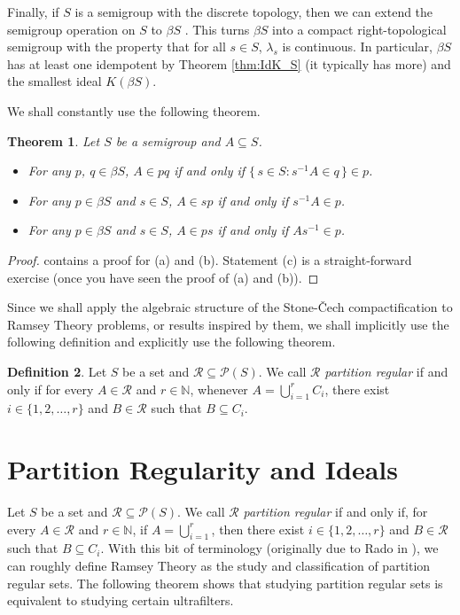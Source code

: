 \documentclass[12pt]{article}
\theoremstyle{plain}
\newtheorem{thm}{Theorem}[section]
\theoremstyle{definition}
\newtheorem{defn}[thm]{Definition}
\newcommand{\bbN}{\mathbb{N}}
\newcommand{\calP}{\mathcal{P}}
\newcommand{\calR}{\mathcal{R}}
\begin{document}
Finally, if $S$ is a semigroup with the discrete topology, then we can
extend the semigroup operation on $S$ to $\beta S$ \cite[Theorem
4.1]{Hindman:1998fk}.
This turns $\beta S$ into a compact right-topological semigroup with
the property that for all $s \in S$, $\lambda_s$ is continuous. 
In particular, $\beta S$ has at least one idempotent by Theorem
\ref{thm:IdK_S} (it typically has more) and the smallest ideal
$K(\beta S)$.

We shall constantly use the following theorem.
\begin{thm}
  Let $S$ be a semigroup and $A \subseteq S$.
  \begin{itemize}
    \item[(a)] For any $p$, $q \in \beta S$, $A \in pq$ if and only if
      $\{\, s \in S : s^{-1}A \in q \,\} \in p$. 
    
    \item[(b)] For any $p \in \beta S$ and $s \in S$, $A \in sp$ if
      and only if $s^{-1}A \in p$.

    \item[(c)] For any $p \in \beta S$ and $s \in S$, $A \in ps$ if
      and only if $As^{-1} \in p$.
  \end{itemize}
\end{thm}
\begin{proof}
  \cite[Theorem 4.12]{Hindman:1998fk} contains a proof for (a) and
  (b).
  Statement (c) is a straight-forward exercise (once you have seen the
  proof of (a) and (b)).
\end{proof}

Since we shall apply the algebraic structure of the Stone-\v{C}ech
compactification to Ramsey Theory problems, or results inspired by
them, we shall implicitly use the following definition and explicitly
use the following theorem. 

\begin{defn}
  Let $S$ be a set and $\calR \subseteq \calP(S)$.
  We call $\calR$ \textsl{partition regular} if and only if for every
  $A \in \calR$ and $r \in \bbN$, whenever $A = \bigcup_{i=1}^r C_i$,
  there exist $i \in \{1, 2, \ldots, r\}$ and $B \in \calR$ such that
  $B \subseteq C_i$.
\end{defn}


\section{Partition Regularity and Ideals}

Let $S$ be a set and $\calR \subseteq \calP(S)$.
We call $\calR$ \textsl{partition regular} if and only if, for every
$A \in \calR$ and $r \in \bbN$, if $A = \bigcup_{i=1}^r$, then there
exist $i \in \{1, 2, \ldots, r\}$ and $B \in \calR$ such that $B
\subseteq C_i$.
With this bit of terminology (originally due to Rado in
\cite{Rado:1945kx}), we can roughly define Ramsey Theory as the
  study and classification of partition regular sets. 
The following theorem shows that studying partition regular sets is
equivalent to studying certain ultrafilters.
\end{document}
